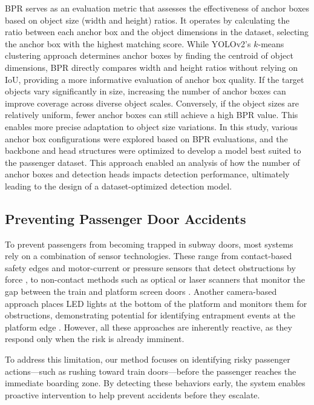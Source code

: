 \documentclass[journal,twoside,web]{ieeecolor}
\begin{document}
\ac{BPR} serves as an evaluation metric that assesses the effectiveness of anchor boxes based on object size (width and height) ratios. It operates by calculating the ratio between each anchor box and the object dimensions in the dataset, selecting the anchor box with the highest matching score. While YOLOv2's $k$-means clustering approach determines anchor boxes by finding the centroid of object dimensions, \ac{BPR} directly compares width and height ratios without relying on \ac{IoU}, providing a more informative evaluation of anchor box quality. If the target objects vary significantly in size, increasing the number of anchor boxes can improve coverage across diverse object scales. Conversely, if the object sizes are relatively uniform, fewer anchor boxes can still achieve a high \ac{BPR} value. This enables more precise adaptation to object size variations. In this study, various anchor box configurations were explored based on \ac{BPR} evaluations, and the backbone and head structures were optimized to develop a model best suited to the passenger dataset. This approach enabled an analysis of how the number of anchor boxes and detection heads impacts detection performance, ultimately leading to the design of a dataset-optimized detection model.


\subsection{Preventing Passenger Door Accidents}
To prevent passengers from becoming trapped in subway doors, most systems rely on a combination of sensor technologies. These range from contact-based safety edges and motor-current or pressure sensors that detect obstructions by force \cite{yao2024failure, bayliss2025passenger, shiao2024wavelet}, to non-contact methods such as optical or laser scanners that monitor the gap between the train and platform screen doors \cite{BEA2025FlatscanS, SICK2025LidarSensors}. Another camera-based approach places LED lights at the bottom of the platform and monitors them for obstructions, demonstrating potential for identifying entrapment events at the platform edge \cite{lu2025urban, heng2025research}. However, all these approaches are inherently reactive, as they respond only when the risk is already imminent.

To address this limitation, our method focuses on identifying risky passenger actions—such as rushing toward train doors—before the passenger reaches the immediate boarding zone. By detecting these behaviors early, the system enables proactive intervention to help prevent accidents before they escalate.
\end{document}
